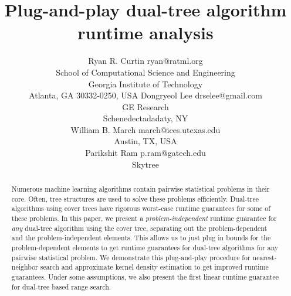 \documentclass[twoside,11pt]{article} %
\begin{document}
\title{Plug-and-play dual-tree algorithm runtime analysis}

\author{\name Ryan R. Curtin \email ryan@ratml.org\\
  \addr School of Computational Science and Engineering\\
  Georgia Institute of Technology\\
  Atlanta, GA 30332-0250, USA
  \AND
  \name Dongryeol Lee \email drselee@gmail.com\\
  \addr GE Research\\
  Schenedectadadaty, NY\\
  \AND
  \name William B. March \email march@ices.utexas.edu\\
  \addr Austin, TX, USA\\
  \AND
  \name Parikshit Ram \email p.ram@gatech.edu\\
  \addr Skytree
}


\maketitle

\begin{abstract}
Numerous machine learning algorithms contain pairwise statistical problems in
their core. Often, tree structures are used to solve these problems efficiently.
Dual-tree algorithms using cover trees have rigorous worst-case runtime
guarantees for some of these problems. In this paper, we present a {\em
problem-independent} runtime guarantee for {\em any} dual-tree algorithm using
the cover tree, separating out the problem-dependent and the problem-independent
elements. This allows us to just plug in bounds for the problem-dependent
elements to get runtime guarantees for dual-tree algorithms for any pairwise
statistical problem. We demonstrate this plug-and-play procedure for
nearest-neighbor search and approximate kernel density estimation to get
improved runtime guarantees.  Under some assumptions, we also present the first
linear runtime guarantee for dual-tree based range search.
\end{abstract}
\end{document}
